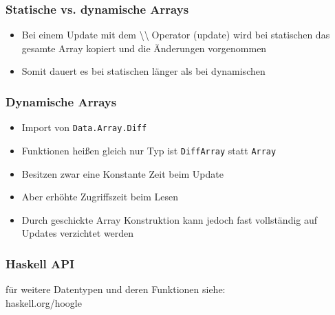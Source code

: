 \begin{frame}
\frametitle{Statische vs. dynamische Arrays}
\begin{block}{\vspace*{-3ex}}
\begin{itemize}
\item Bei einem Update mit dem \textbackslash\textbackslash$\;$Operator (update) wird bei statischen das gesamte Array kopiert und die Änderungen vorgenommen
\item Somit dauert es bei statischen länger als bei dynamischen
\end{itemize}
\end{block}
\end{frame}

\begin{frame}
\frametitle{Dynamische Arrays}
\begin{block}{\vspace*{-3ex}}
\begin{itemize}
\item Import von \lstinline|Data.Array.Diff|
\item Funktionen heißen gleich nur Typ ist \lstinline|DiffArray| statt \lstinline|Array|
\item Besitzen zwar eine Konstante Zeit beim Update
\item Aber erhöhte Zugriffszeit beim Lesen
\item Durch geschickte Array Konstruktion kann jedoch fast vollständig auf Updates verzichtet werden
\end{itemize}
\end{block}
\end{frame}

\begin{frame}[fragile]
\frametitle{Haskell API}
\begin{block}{\vspace*{-3ex}}
für weitere Datentypen und deren Funktionen siehe:\\
haskell.org/hoogle
\end{block}
\end{frame}

